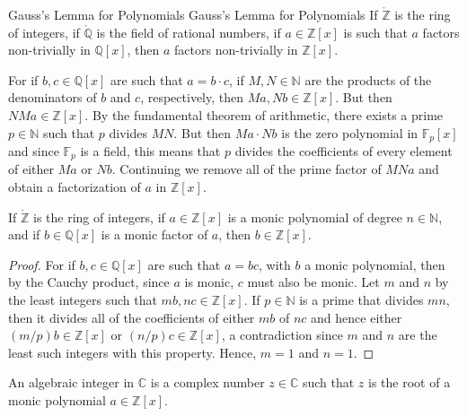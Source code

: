 \documentclass{article}                                                        %
\begin{document}
        \begin{ftheorem}{Gauss's Lemma for Polynomials}
                        {Gauss's Lemma for Polynomials}
            If $\ring{\mathbb{Z}}$ is the ring of integers, if
            $\ring{\mathbb{Q}}$ is the field of rational numbers, if
            $a\in{\mathbb{Z}}[x]$ is such that $a$ factors non-trivially in
            $\mathbb{Q}[x]$, then $a$ factors non-trivially in $\mathbb{Z}[x]$.
        \end{ftheorem}
        \begin{bproof}
            For if $b,c\in\mathbb{Q}[x]$ are such that $a=b\cdot{c}$, if
            $M,N\in\mathbb{N}$ are the products of the denominators of $b$
            and $c$, respectively, then $Ma,Nb\in\mathbb{Z}[x]$. But then
            $NMa\in\mathbb{Z}[x]$. By the fundamental theorem of arithmetic,
            there exists a prime $p\in\mathbb{N}$ such that $p$ divides $MN$.
            But then $Ma\cdot{N}b$ is the zero polynomial in $\mathbb{F}_{p}[x]$
            and since $\mathbb{F}_{p}$ is a field, this means that $p$ divides
            the coefficients of every element of either $Ma$ or $Nb$. Continuing
            we remove all of the prime factor of $MNa$ and obtain a
            factorization of $a$ in $\mathbb{Z}[x]$.
        \end{bproof}
        \begin{theorem}
            If $\ring{\mathbb{Z}}$ is the ring of integers, if
            $a\in\mathbb{Z}[x]$ is a monic polynomial of degree
            $n\in\mathbb{N}$, and if $b\in\mathbb{Q}[x]$ is a monic factor of
            $a$, then $b\in\mathbb{Z}[x]$.
        \end{theorem}
        \begin{proof}
            For if $b,c\in\mathbb{Q}[x]$ are such that $a=bc$, with $b$ a monic
            polynomial, then by the Cauchy product, since $a$ is monic, $c$
            must also be monic. Let $m$ and $n$ by the least integers such that
            $mb,nc\in\mathbb{Z}[x]$. If $p\in\mathbb{N}$ is a prime that divides
            $mn$, then it divides all of the coefficients of either $mb$ of $nc$
            and hence either $(m/p)b\in\mathbb{Z}[x]$ or
            $(n/p)c\in\mathbb{Z}[x]$, a contradiction since $m$ and $n$ are the
            least such integers with this property. Hence, $m=1$ and $n=1$.
        \end{proof}
        \begin{definition}
            An algebraic integer in $\mathbb{C}$ is a complex number
            $z\in\mathbb{C}$ such that $z$ is the root of a monic polynomial
            $a\in\mathbb{Z}[x]$.
        \end{definition}
\end{document}
